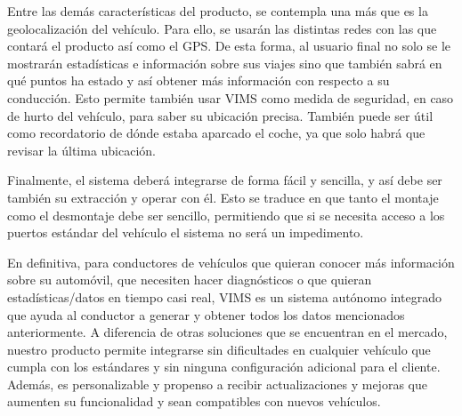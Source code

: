 Entre las demás características del producto, se contempla una más que es la
geolocalización del vehículo. Para ello, se usarán las distintas redes con
las que contará el producto así como el \ac{GPS}. De esta forma,
al usuario final no solo se le mostrarán estadísticas e información sobre sus
viajes sino que también sabrá en qué puntos ha estado y así obtener más
información con respecto a su conducción. Esto permite también usar \ac{VIMS} como
medida de seguridad, en caso de hurto del vehículo, para saber su ubicación
precisa. También puede ser útil como recordatorio de dónde estaba aparcado el
coche, ya que solo habrá que revisar la última ubicación.

Finalmente, el sistema deberá integrarse de forma fácil y sencilla, y así debe ser
también su extracción y operar con él. Esto se traduce en que tanto el
montaje como el desmontaje debe ser sencillo, permitiendo que si se necesita acceso
a los puertos estándar del vehículo el sistema no será un impedimento.

En definitiva, para conductores de vehículos que quieran conocer
más información sobre su automóvil, que necesiten hacer diagnósticos o que quieran
estadísticas/datos en tiempo casi real, \ac{VIMS} es un sistema autónomo integrado
que ayuda al conductor a generar y obtener todos los datos mencionados anteriormente. 
A diferencia de otras soluciones que se encuentran
en el mercado, nuestro producto permite integrarse sin dificultades en cualquier
vehículo que cumpla con los estándares y sin ninguna configuración adicional para
el cliente. Además, es personalizable y propenso a recibir actualizaciones
y mejoras que aumenten su funcionalidad y sean compatibles con nuevos vehículos.